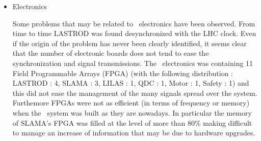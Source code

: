 \begin{itemize}
\item{Electronics}

Some problems that may be related to \lasi~electronics have been observed. From time to time LASTROD was found desynchronized with the LHC clock. Even if the origin of the problem has never been clearly identified, it seems clear that the number of electronic boards does not tend to ease the synchronization and signal transmissions. The \lasi~electronics was containing 11 Field Programmable Arrays (FPGA) (with the following distribution : LASTROD : 4, SLAMA : 3, LILAS : 1, QDC : 1, Motor : 1, Safety : 1) and this did not ease the management of the many signals spread over the system. Furthemore FPGAs were not as efficient (in terms of frequency or memory) when the \lasi~system was built as they are nowadays. In particular the memory of SLAMA's FPGA was filled at the level of more than 80\% making difficult to manage an increase of information that may be due to hardware upgrades.  



\end{itemize}
